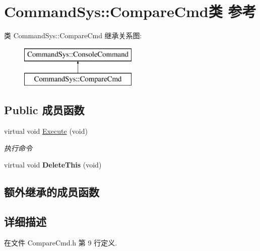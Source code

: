 \hypertarget{class_command_sys_1_1_compare_cmd}{\section{Command\-Sys\-:\-:Compare\-Cmd类 参考}
\label{class_command_sys_1_1_compare_cmd}
}
类 Command\-Sys\-:\-:Compare\-Cmd 继承关系图\-:\begin{figure}[H]
\begin{center}
\leavevmode
\includegraphics[height=2.000000cm]{class_command_sys_1_1_compare_cmd}
\end{center}
\end{figure}
\subsection*{Public 成员函数}
\begin{DoxyCompactItemize}
\item 
virtual void \hyperlink{class_command_sys_1_1_compare_cmd_a20c521a7bd9d1b92f6ef16416cf2784f}{Execute} (void)
\begin{DoxyCompactList}\small\item\em 执行命令 \end{DoxyCompactList}\item 
\hypertarget{class_command_sys_1_1_compare_cmd_a279dd1e78937c4f09f0b266adcfe9242}{virtual void {\bfseries Delete\-This} (void)}\label{class_command_sys_1_1_compare_cmd_a279dd1e78937c4f09f0b266adcfe9242}

\end{DoxyCompactItemize}
\subsection*{额外继承的成员函数}


\subsection{详细描述}


在文件 Compare\-Cmd.\-h 第 9 行定义.



